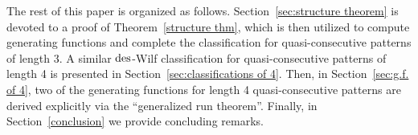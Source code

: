 The rest of this paper is organized as follows. Section~\ref{sec:structure theorem} is devoted to a proof of Theorem~\ref{structure thm}, which is then utilized to compute generating functions and complete the classification for quasi-consecutive patterns of length 3. A similar $\mathrm{des}$-Wilf classification for quasi-consecutive patterns of length 4 is presented in Section~\ref{sec:classifications of 4}. Then, in Section~\ref{sec:g.f. of 4}, two of the generating functions for length 4 quasi-consecutive patterns are derived explicitly via the ``generalized run theorem''. Finally, in Section~\ref{conclusion} we provide concluding remarks.


